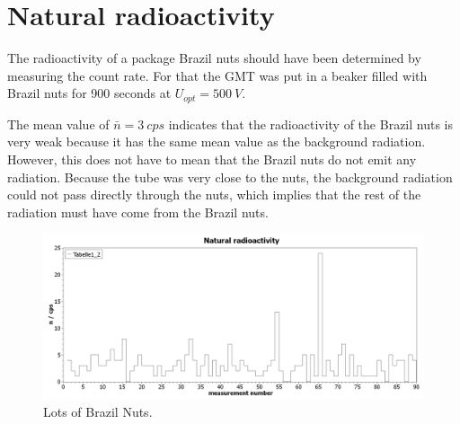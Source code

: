 \section{Natural radioactivity}
%
The radioactivity of a package Brazil nuts should have been determined by measuring the count rate. For that the GMT was
put in a beaker filled with Brazil nuts for 900 seconds at \( U_{opt}=\SI{500}{V} \).\par
The mean value of \( \bar{n}=\SI{3}{cps} \) indicates that the radioactivity of the Brazil nuts is very weak because it
has the same mean value as the background radiation. However, this does not have to mean that the Brazil nuts do not emit
any radiation. Because the tube was very close to the nuts, the background radiation could not pass directly through the
nuts, which implies that the rest of the radiation must have come from the Brazil nuts.
\begin{figure}[h]
    \centering
    \includegraphics[width=.8\textwidth]{scidavis/Fig.12_Natural radioactivity.jpg}
    \caption[Brazil Nutz]{Lots of Brazil Nuts.}
    \label{fig:brazilNutz}
\end{figure}